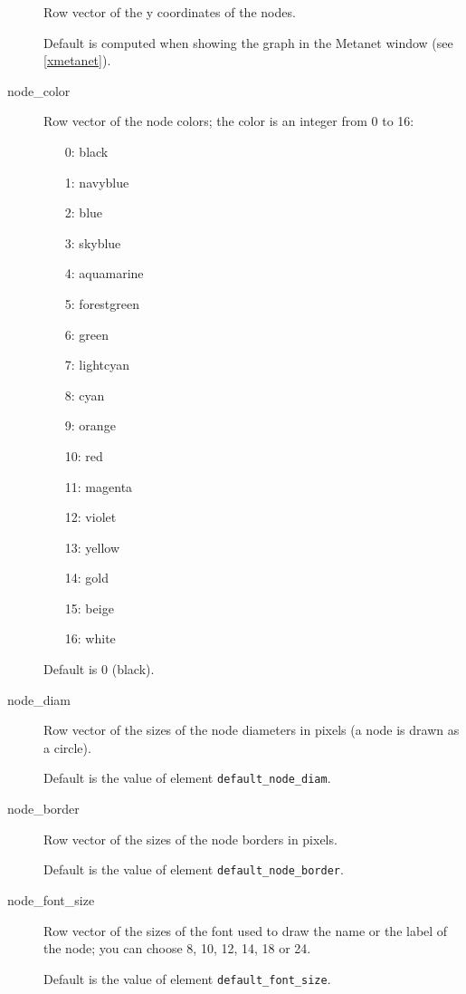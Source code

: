 \documentclass[11pt]{article}
\begin{document}
\begin{description}
Row vector of the y coordinates of the nodes.

Default is computed when showing the graph in the Metanet window
(see \ref{xmetanet}).

  \item[node\_color]

Row vector of the node colors; 
the color is an integer from 0 to 16:
\begin{itemize}
  \item[0:] black
  \item[1:] navyblue
  \item[2:] blue
  \item[3:] skyblue
  \item[4:] aquamarine
  \item[5:] forestgreen
  \item[6:] green
  \item[7:] lightcyan
  \item[8:] cyan
  \item[9:] orange
  \item[10:] red
  \item[11:] magenta
  \item[12:] violet
  \item[13:] yellow
  \item[14:] gold
  \item[15:] beige
  \item[16:] white
\end{itemize}

Default is 0 (black).

  \item[node\_diam]

Row vector of the sizes of the node diameters in pixels (a node is
drawn as a circle).

Default is the value of element \texttt{default\_node\_diam}.

  \item[node\_border]

Row vector of the sizes of the node borders in pixels.

Default is the value of element \texttt{default\_node\_border}.

  \item[node\_font\_size]

Row vector of the sizes of the font used to draw the name or the label
of the node; 
you can choose
8, 10, 12, 14, 18 or 24.

Default is the value of element \texttt{default\_font\_size}.


\end{description}
\end{document}
